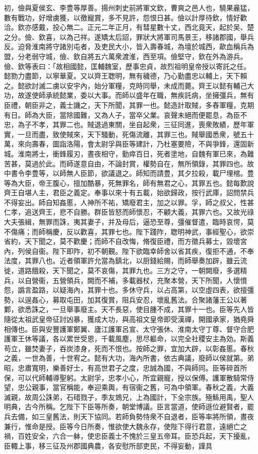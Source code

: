 \begin{pinyinscope}
初，儉與夏侯玄、李豊等厚善。揚州刺史前將軍文欽，曹爽之邑人也，驍果麄猛，數有戰功，好增虜獲，以徼寵賞，多不見許，怨恨日甚。儉以計厚待欽，情好歡洽。欽亦感戴，投心無二。正元二年正月，有彗星數十丈，西北竟天，起於吴、楚之分。儉、欽喜，以為己祥。遂矯太后詔，罪狀大將軍司馬景王，移諸郡國，舉兵反。迫脅淮南將守諸別屯者，及吏民大小，皆入壽春城，為壇於城西，歃血稱兵為盟，分老弱守城，儉、欽自將五六萬衆渡淮，西至項。儉堅守，欽在外為游兵。儉、欽等表曰：「故相國懿，匡輔魏室，歷事忠貞，故烈祖明皇帝授以寄託之任。懿勠力盡節，以寧華夏。又以齊王聦明，無有穢德，乃心勤盡忠以輔上，天下賴之。懿欲討滅二虜以安宇內，始分軍糧，克時同舉，未成而薨。齊王以懿有輔己大功，故遂使師承統懿業，委以大事。而師以盛年在職，無疾託病，坐擁彊兵，無有臣禮，朝臣非之，義士譏之，天下所聞，其罪一也。懿造計取賊，多舂軍糧，克期有日。師為大臣，當除國難，又為人子，當卒父業。哀聲未絕而便罷息，為臣不忠，為子不孝，其罪二也。賊退過東關，坐自起衆，三征同進，喪衆敗績，歷年軍實，一旦而盡，致使賊來，天下騷動，死傷流離，其罪三也。賊舉國悉衆，號五十萬，來向壽春，圖詣洛陽，會太尉孚與臣等建計，乃杜塞要險，不與爭鋒，還固新城。淮南將士，衝鋒履刃，晝夜相守，勤瘁百日，死者塗地，自魏有軍已來，為難苦甚，莫過於此。而師遂意自由，不論封賞，權勢自在，無所領錄，其罪四也。故中書令李豊等，以師無人臣節，欲議退之。師知而請豊，其夕拉殺，載尸埋棺。豊等為大臣，帝王腹心，擅加酷暴，死無罪名，師有無君之心，其罪五也。懿每歎說齊王自堪人主，君臣之義定。奉事以來十有五載，始欲歸政，按行武庫，詔問禁兵不得妄出。師自知姦慝，人神所不祐，矯廢君主，加之以罪。孚，師之叔父，性甚仁孝，追送齊王，悲不自勝。群臣皆怒而師懷忍，不顧大義，其罪六也。又故光祿大夫張緝，無罪而誅，夷其妻子，并及母后，逼恐至尊，彊催督遣，臨時哀愕，莫不傷痛；而師稱慶，反以歡喜，其罪七也。陛下踐阼，聦明神武，事經聖心，欲崇省約，天下聞之，莫不歡慶；而師不自改悔，脩復臣禮，而方徵兵募士，毀壞宮內，列侯自衞。陛下即阼，初不朝覲。陛下欲臨幸師舍以省其疾，復拒不通，不奉法度，其罪八也。近者領軍許允當為鎮北，以厨錢給賜，而師舉奏加辟，雖云流徙，道路餓殺，天下聞之，莫不哀傷，其罪九也。三方之守，一朝闕廢，多選精兵，以自營衞，五營領兵，闕而不補，多載器杖，充聚本營，天下所聞，人懷憤怨，譌言盈路，以疑海內，其罪十也。多休守兵，以占高第，以空虛四表，欲擅彊勢，以逞姦心，募取屯田，加其復賞，阻兵安忍，壞亂舊法。合聚諸藩王公以著鄴，欲悉誅之，一旦舉事廢主。天不長惡，使目腫不成，其罪十一也。臣等先人皆隨從太祖武皇帝征討凶暴，獲成大功，與高祖文皇帝即受漢禪，開國承家，猶堯舜相傳也。臣與安豐護軍鄭翼、廬江護軍呂宣、太守張休、淮南太守丁尊、督守合肥護軍王休等議，各以累世受恩，千載風塵，思尽軀命，以完全社稷安主為効。斯義苟立，雖焚妻子，吞炭漆身，死而不恨也。按師之罪，宜加大辟，以彰姦慝。春秋之義，一世為善，十世宥之。懿有大功，海內所書，依古典議，廢師以侯就第。弟昭，忠肅寬明，樂善好士，有高世君子之度，忠誠為國，不與師同。臣等碎首所保，可以代師輔導聖躬。太尉孚，忠孝小心，所宜親寵，授以保傅。護軍散騎常侍望，忠公親事，當官稱能，奉迎乘輿，有宿衞之舊，可為中領軍。春秋之義，大義滅親，故周公誅弟，石碏戮子，季友鴆兄，上為國計，下全宗族。殛鯀用禹，聖人明典，古今所稱。乞陛下下臣等所奏，朝堂博議。臣言當道，使師遜位避賢者，罷兵去備，如三皇舊法，則天下協同。若師負勢恃衆不自退者，臣等率將所領，晝夜兼行，惟命是授。臣等今日所奏，惟欲使大魏永存，使陛下得行君意，遠絕亡之禍，百姓安全，六合一躰，使忠臣義士不愧於三皇五帝耳。臣恐兵起，天下擾亂，臣輙上事，移三征及州郡國典農，各安慰所部吏民，不得妄動，謹具
\end{pinyinscope}
